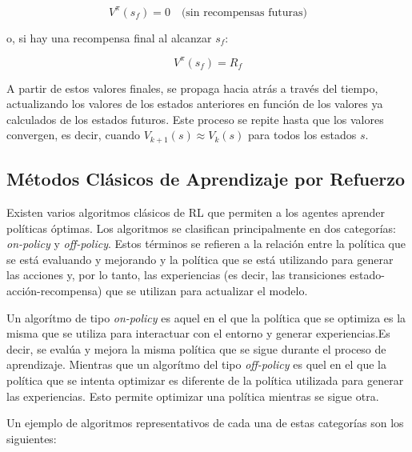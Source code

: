 \documentclass[a4paper,12pt]{report}
\begin{document}
\begin{equation}
V^\pi(s_f) = 0 \quad \text{(sin recompensas futuras)} 
\end{equation}

o, si hay una recompensa final al alcanzar \(s_f\):

\begin{equation}
V^\pi(s_f) = R_f
\end{equation}

A partir de estos valores finales, se propaga hacia atrás a través del tiempo, actualizando 
los valores de los estados anteriores en función de los valores ya calculados de los estados 
futuros. Este proceso se repite hasta que los valores convergen, es decir, cuando \(V_{k+1}(s) 
\approx V_k(s)\) para todos los estados \(s\).


\subsection{Métodos Clásicos de Aprendizaje por Refuerzo}

Existen varios algoritmos clásicos de RL que permiten a los agentes aprender políticas óptimas. Los 
algoritmos se clasifican principalmente en dos categorías: \textit{on-policy} y \textit{off-policy}. 
Estos términos se refieren a la relación entre la política que se está evaluando y mejorando y la 
política que se está utilizando para generar las acciones y, por lo tanto, las experiencias (es decir, 
las transiciones estado-acción-recompensa) que se utilizan para actualizar el modelo.

Un algorítmo de tipo \textit{on-policy} es aquel en el que la política que se optimiza es la misma que 
se utiliza para interactuar con el entorno y generar experiencias.Es decir, se evalúa y mejora la misma
política que se sigue durante el proceso de aprendizaje. Mientras que un algorítmo del tipo \textit{off-policy}
es quel en el que la política que se intenta optimizar es diferente de la política utilizada para generar
las experiencias. Esto permite optimizar una política mientras se sigue otra.

Un ejemplo de algoritmos representativos de cada una de estas categorías son los siguientes:
\end{document}
